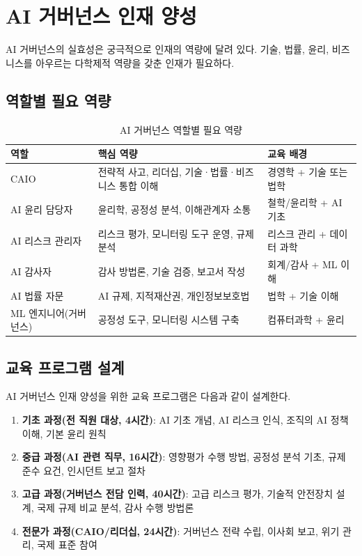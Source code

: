 \section{AI 거버넌스 인재 양성}
\label{sec:20.3.3}

AI 거버넌스의 실효성은 궁극적으로 인재의 역량에 달려 있다. 기술, 법률, 윤리, 비즈니스를 아우르는 다학제적 역량을 갖춘 인재가 필요하다.

\subsection{역할별 필요 역량}

\begin{table}[htbp]
\centering
\caption{AI 거버넌스 역할별 필요 역량}
\label{tab:20_competency}
\begin{tabularx}{\textwidth}{p{2.5cm}p{4.5cm}X}
\toprule
\textbf{역할} & \textbf{핵심 역량} & \textbf{교육 배경} \\
\midrule
CAIO & 전략적 사고, 리더십, 기술·법률·비즈니스 통합 이해 & 경영학 + 기술 또는 법학 \\
AI 윤리 담당자 & 윤리학, 공정성 분석, 이해관계자 소통 & 철학/윤리학 + AI 기초 \\
AI 리스크 관리자 & 리스크 평가, 모니터링 도구 운영, 규제 분석 & 리스크 관리 + 데이터 과학 \\
AI 감사자 & 감사 방법론, 기술 검증, 보고서 작성 & 회계/감사 + ML 이해 \\
AI 법률 자문 & AI 규제, 지적재산권, 개인정보보호법 & 법학 + 기술 이해 \\
ML 엔지니어(거버넌스) & 공정성 도구, 모니터링 시스템 구축 & 컴퓨터과학 + 윤리 \\
\bottomrule
\end{tabularx}
\end{table}

\subsection{교육 프로그램 설계}

AI 거버넌스 인재 양성을 위한 교육 프로그램은 다음과 같이 설계한다.

\begin{enumerate}
 \item \textbf{기초 과정(전 직원 대상, 4시간)}: AI 기초 개념, AI 리스크 인식, 조직의 AI 정책 이해, 기본 윤리 원칙
 \item \textbf{중급 과정(AI 관련 직무, 16시간)}: 영향평가 수행 방법, 공정성 분석 기초, 규제 준수 요건, 인시던트 보고 절차
 \item \textbf{고급 과정(거버넌스 전담 인력, 40시간)}: 고급 리스크 평가, 기술적 안전장치 설계, 국제 규제 비교 분석, 감사 수행 방법론
 \item \textbf{전문가 과정(CAIO/리더십, 24시간)}: 거버넌스 전략 수립, 이사회 보고, 위기 관리, 국제 표준 참여
\end{enumerate}

